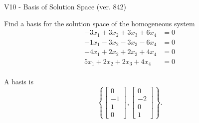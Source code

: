 \begin{exercise}
  \begin{exerciseTitle}V10 - Basis of Solution Space (ver. 842)\end{exerciseTitle}
  \begin{exerciseStatement}
    Find a basis for the solution space of the homogeneous system 
\begin{align*}
 -3 x_ 1 + 3 x_ 2 + 3 x_ 3 + 6 x_ 4 &= 0  \\ 
  -1 x_ 1 -3 x_ 2 -3 x_ 3 -6 x_ 4 &= 0  \\ 
  -4 x_ 1 + 2 x_ 2 + 2 x_ 3 + 4 x_ 4 &= 0  \\ 
  5 x_ 1 + 2 x_ 2 + 2 x_ 3 + 4 x_ 4 &= 0  \\ 
 \end{align*}


 
  \end{exerciseStatement}

  \begin{exerciseAnswer}
   A basis is   
\[\left\{\left[\begin{array}{c}
0 \\
-1 \\
1 \\
0
\end{array}\right] , \left[\begin{array}{c}
0 \\
-2 \\
0 \\
1
\end{array}\right]\right\}.\]

  


  \end{exerciseAnswer}
\end{exercise}